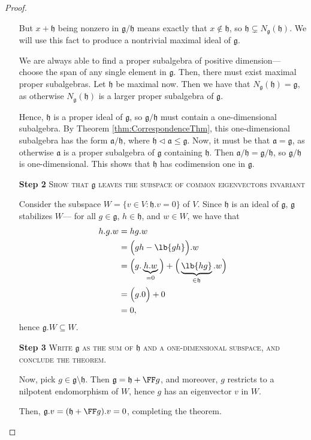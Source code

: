 \documentclass{article}
\newcommand*\tle{\ensuremath{\mathrel{\lhd}}}
\DeclarePairedDelimiter\lb\lbrack\rbrack
\newcommand*\frka{{\ensuremath{\mathfrak{a}}}}
\newcommand*\frkg{{\ensuremath{\mathfrak{g}}}}
\newcommand*\frkh{{\ensuremath{\mathfrak{h}}}}
\newcommand*\acts{.}
\begin{document}
\begin{proof}
\begin{itemize}
            But $x + \frkh$ being nonzero in $\frkg/\frkh$ means exactly that $x \notin \frkh$, so $\frkh \subsetneq N_\frkg(\frkh)$.
            We will use this fact to produce a nontrivial maximal ideal of $\frkg$.

            We are always able to find a proper subalgebra of positive dimension--- choose the span of any single element in $\frkg$. 
            Then, there must exist maximal proper subalgebras. 
            Let $\frkh$ be maximal now. 
            Then we have that $N_\frkg(\frkh) = \frkg$, as otherwise $N_\frkg(\frkh)$ is a larger proper subalgebra of $\frkg$.

            Hence, $\frkh$ is a proper ideal of $\frkg$, so $\frkg/\frkh$ must contain a one-dimensional subalgebra.
            By Theorem \ref{thm:CorrespondenceThm}, this one-dimensional subalgebra has the form $\frka/\frkh$, where $\frkh \tle \frka \leq \frkg$.
            Now, it must be that $\frka = \frkg$, as otherwise $\frka$ is a proper subalgebra of $\frkg$ containing $\frkh$.
            Then $\frka/\frkh = \frkg/\frkh$, so $\frkg/\frkh$ is one-dimensional.
            This shows that $\frkh$ has codimension one in $\frkg$.

        \item[\textbf{Step 2}] 
            \textsc{\color{Crimson} Show that $\frkg$ leaves the subspace of common eigenvectors invariant}

            Consider the subspace $W = \{ v \in V : \frkh \acts v = 0 \}$ of $V$.
            Since $\frkh$ is an ideal of $\frkg$, $\frkg$ stabilizes $W$--- for all $g \in \frkg$, $h \in \frkh$, and $w \in W$, we have that
            \begin{align*}
                h \acts g \acts w
                &=
                hg \acts w
                \\
                &= 
                \Big(gh - \lb{gh}\Big) \acts w
                \\
                &=
                \Big( g \acts \underbrace{h \acts w}_{=0} \Big) + \Big(\underbrace{\lb{hg}}_{\in \frkh} \acts w\Big)
                \\
                &=
                \Big( g \acts 0 \Big) + 0
                \\
                &=
                0,
            \end{align*}
            hence $\frkg \acts W \subseteq W$.

        \item[\textbf{Step 3}] 
            \textsc{\color{Crimson} Write $\frkg$ as the sum of $\frkh$ and a one-dimensional subspace, and conclude the theorem.}

            Now, pick $g \in \frkg \setminus \frkh$.
            Then $\frkg = \frkh + \FF g$, and moreover, $g$ restricts to a nilpotent endomorphism of $W$, hence $g$ has an eigenvector $v$ in $W$.

            Then, $\frkg.v = (\frkh + \FF g) \acts v = 0$, completing the theorem.
        \end{itemize}
\end{proof}
\end{document}
